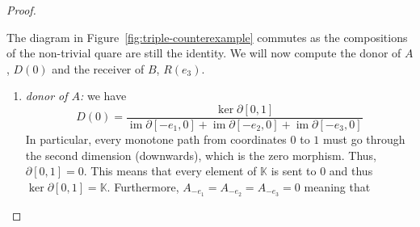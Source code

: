 \documentclass[a4paper]{article}
\DeclareMathOperator{\im}{im}
\begin{document}
\begin{proof}
\begin{center}
\begin{minipage}{0.45\textwidth}
    \end{minipage}
    \label{fig:triple-counterexample}
    \end{center}
    The diagram in Figure~\ref{fig:triple-counterexample} commutes as the compositions of the non-trivial quare are still the identity.
    We will now compute the donor of \(A\), \(D(0)\) and the receiver of \(B\), \(R(e_3)\).
    \begin{enumerate}
        \item \emph{donor of \(A\):} we have \[
            D(0) = \frac{\ker \partial[0,1]}{
                \im \partial[-e_1, 0]
                + \im \partial[-e_2, 0]
                + \im \partial[-e_3, 0]
            }
        \]
        In particular, every monotone path from coordinates \(0\) to \(1\) must go through the second dimension (downwards), which is the zero morphism. Thus,
        \(\partial[0,1] = 0\). This means that every element of \(\mathbb K\) is sent to \(0\) and thus \(\ker\partial[0,1] = \mathbb K\).
        Furthermore, \(A_{-e_1} = A_{-e_2} = A_{-e_3} = 0\) meaning that \[
\]
\end{enumerate}
\end{proof}
\end{document}
